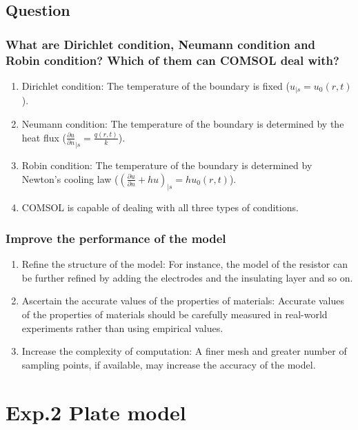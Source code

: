 \documentclass[12pt,a4paper,UTF8]{article}
\begin{document}
    \subsection{Question}
        \subsubsection{What are Dirichlet condition, Neumann condition and Robin condition? Which of them can COMSOL deal with?}
        \begin{enumerate}[label=\arabic*.]
            \item Dirichlet condition: The temperature of the boundary is fixed ($u_{|s} = u_0(r, t)$).
            \item Neumann condition: The temperature of the boundary is determined by the heat flux ($\frac{\partial u}{\partial n}_{|s} = \frac{q(r, t)}{k}$).
            \item Robin condition: The temperature of the boundary is determined by Newton's cooling law ($(\frac{\partial u}{\partial n}+hu)_{|s} = hu_0(r, t)$).
            \item COMSOL is capable of dealing with all three types of conditions.
        \end{enumerate}
        \subsubsection{Improve the performance of the model}
        \begin{enumerate}[label=\arabic*.]
            \item Refine the structure of the model: For instance, the model of the resistor can be further refined by adding the electrodes and the insulating layer and so on.
            \item Ascertain the accurate values of the properties of materials: Accurate values of the properties of materials should be carefully measured in real-world experiments rather than using empirical values.
            \item Increase the complexity of computation: A finer mesh and greater number of sampling points, if available, may increase the accuracy of the model.
        \end{enumerate}



\section{Exp.2 Plate model}
\end{document}
